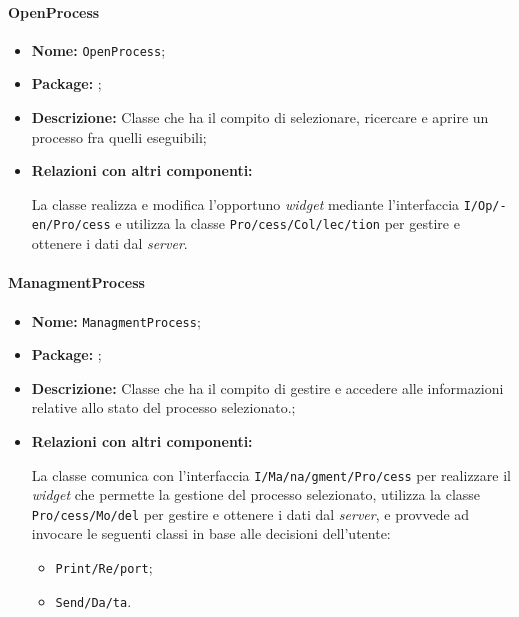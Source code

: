 \paragraph{OpenProcess}
\begin{flushleft}
\begin{itemize}
\item \textbf{Nome:} \texttt{OpenProcess};
\item \textbf{Package:} \texttt{\logicUser};
\item \textbf{Descrizione:} Classe che ha il compito di selezionare, ricercare e aprire un processo fra quelli eseguibili;
\item \textbf{Relazioni con altri componenti:}
\begin{sloppypar}
La classe realizza e modifica l'opportuno \textit{widget} mediante l'interfaccia \texttt{\logicUser{}I\fshyp{}Op\fshyp{}en\fshyp{}Pro\fshyp{}cess} e utilizza la classe \texttt{\collection{}Pro\fshyp{}cess\fshyp{}Col\fshyp{}lec\fshyp{}tion} per gestire e ottenere i dati dal \textit{server}.
\end{sloppypar}
\end{itemize}
\end{flushleft}

\paragraph{ManagmentProcess}
\begin{flushleft}
\begin{itemize}
\item \textbf{Nome:} \texttt{ManagmentProcess};
\item \textbf{Package:} \texttt{\logicUser};
\item \textbf{Descrizione:} Classe che ha il compito di gestire e accedere alle informazioni relative allo stato del processo selezionato.;
\item \textbf{Relazioni con altri componenti:}
\begin{sloppypar}
La classe comunica con l'interfaccia \texttt{\logicUser{}I\fshyp{}Ma\fshyp{}na\fshyp{}gment\fshyp{}Pro\fshyp{}cess} per realizzare il \textit{widget} che permette la gestione del processo selezionato, utilizza la classe \texttt{\model{}Pro\fshyp{}cess\fshyp{}Mo\fshyp{}del} per gestire e ottenere i dati dal \textit{server}, e provvede ad invocare le seguenti classi in base alle decisioni dell'utente:
\begin{itemize}
\item \texttt{\logicUser{}Print\fshyp{}Re\fshyp{}port};
\item \texttt{\logicUser{}Send\fshyp{}Da\fshyp{}ta}.
\end{itemize}
\end{sloppypar}
\end{itemize}
\end{flushleft}

